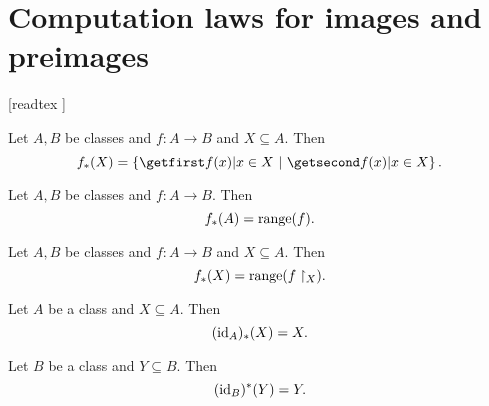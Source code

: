 \documentclass[../set-theory.tex]{subfiles}
\begin{document}
  \chapter{Computation laws for images and preimages}\label{image-and-preimage}


  \begin{forthel}

    [readtex ]

  \end{forthel}

  \begin{forthel}
    \begin{proposition}
      Let $A, B$ be classes and $f : A \to B$ and $X \subseteq A$.
      Then \[ f_{*}(X) = \class{ f(x) | x \in X }. \]
    \end{proposition}
  \end{forthel}

  \begin{forthel}
    \begin{corollary}
      Let $A, B$ be classes and $f : A \to B$.
      Then \[ f_{*}(A) = \operatorname{range}(f). \]
    \end{corollary}
  \end{forthel}

  \begin{forthel}
    \begin{corollary}
      Let $A, B$ be classes and $f : A \to B$ and $X \subseteq A$.
      Then \[ f_{*}(X) = \operatorname{range}(f \restriction_{X}). \]
    \end{corollary}
  \end{forthel}

  \begin{forthel}
    \begin{proposition}
      Let $A$ be a class and $X \subseteq A$.
      Then \[ (\operatorname{id}_{A})_{*}(X) = X. \]
    \end{proposition}
  \end{forthel}

  \begin{forthel}
    \begin{proposition}
      Let $B$ be a class and $Y \subseteq B$.
      Then \[ (\operatorname{id}_{B})^{*}(Y) = Y. \]
    \end{proposition}
  \end{forthel}
\end{document}
